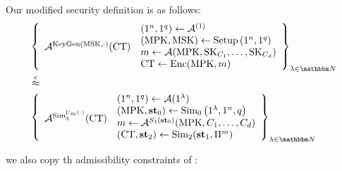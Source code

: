 Our modified security definition is as follows:
\begin{equation}
\label{eq:FEsec}
\begin{aligned}
	&\left\{
		\begin{array}{l}
		\vcenter{\hbox{$\advers^{\text{KeyGen}(\MSK, \cdot)}(\mathbf{\FECT})$}}
		\end{array}
		\begin{array}{l}
		\left(1^n, 1^q\right) \leftarrow \advers^{(1)} \\
		\left(\MPK, \MSK\right) \leftarrow \text{Setup}\left(1^n, 1^q\right) \\
		m \leftarrow \advers(\MPK, \SK_{C_1}, \dots, \SK_{C_d}) \\
		\FECT \leftarrow \text{Enc}(\MPK, m)
		\end{array}
	\right\}_{\lambda \in \N}\\
&\compInd \\
	&\left\{
		\begin{array}{l}
		\vcenter{\hbox{$\advers^{\Sim_3^{U_m(\cdot)}}(\FECT)$}}
		\end{array}
		\begin{array}{l}
		\left(1^n, 1^q\right) \leftarrow \advers{(1^\lambda)} \\
		\left(\MPK, \mathbf{st}_0\right) \leftarrow \Sim_0\left(1^\lambda, 1^n, q\right) \\
		m \leftarrow \advers^{S_1(\mathbf{st}_0)}(\MPK, C_1, \dots, C_d) \\
		\left(\FECT, \mathbf{st}_2\right) \leftarrow \Sim_2(\mathbf{st}_1, \Pi^m)
		\end{array}
	\right\}_{\lambda \in \N}
\end{aligned}
\end{equation}

we also copy th admissibility constraints of \cite{garg2022dynamic}:

